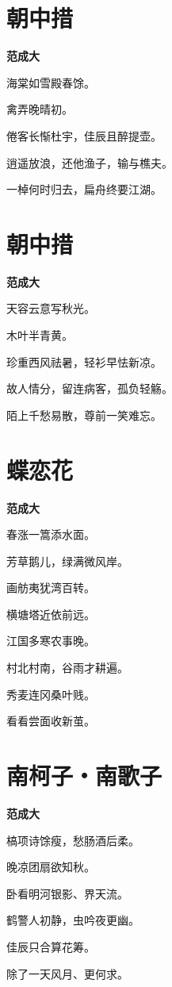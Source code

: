 \documentclass[12pt,a4paper]{ctexbook}
\begin{document}
\section{朝中措}
\textbf{范成大}\par\vspace{0.5em}
海棠如雪殿春馀。\par
禽弄晚晴初。\par
倦客长惭杜宇，佳辰且醉提壶。\par
逍遥放浪，还他渔子，输与樵夫。\par
一棹何时归去，扁舟终要江湖。\par

\section{朝中措}
\textbf{范成大}\par\vspace{0.5em}
天容云意写秋光。\par
木叶半青黄。\par
珍重西风祛暑，轻衫早怯新凉。\par
故人情分，留连病客，孤负轻觞。\par
陌上千愁易散，尊前一笑难忘。\par

\section{蝶恋花}
\textbf{范成大}\par\vspace{0.5em}
春涨一篙添水面。\par
芳草鹅儿，绿满微风岸。\par
画舫夷犹湾百转。\par
横塘塔近依前远。\par
江国多寒农事晚。\par
村北村南，谷雨才耕遍。\par
秀麦连冈桑叶贱。\par
看看尝面收新茧。\par

\section{南柯子・南歌子}
\textbf{范成大}\par\vspace{0.5em}
槁项诗馀瘦，愁肠酒后柔。\par
晚凉团扇欲知秋。\par
卧看明河银影、界天流。\par
鹤警人初静，虫吟夜更幽。\par
佳辰只合算花筹。\par
除了一天风月、更何求。\par
\end{document}
